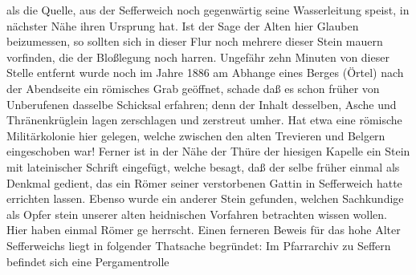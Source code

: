 

als die Quelle, aus der Sefferweich noch gegenwärtig seine\ob
Wasserleitung speist, in nächster Nähe ihren Ursprung hat.\ob
Ist der Sage der Alten hier Glauben beizumessen, so\ob
sollten sich in dieser Flur noch mehrere dieser Stein\ohb
mauern vorfinden, die der Bloßlegung noch harren.\ob
Ungefähr zehn Minuten von dieser Stelle entfernt\ob
wurde noch im Jahre 1886 am Abhange eines Berges\ob
(Örtel) nach der Abendseite ein römisches Grab geöffnet,\ob
schade daß es schon früher von Unberufenen dasselbe\ob
Schicksal erfahren; denn der Inhalt desselben, Asche\ob
und Thränenkrüglein lagen zerschlagen und zerstreut\ob
umher. Hat etwa eine römische Militärkolonie\ob
hier gelegen, welche zwischen den alten Trevieren\ob
und Belgern eingeschoben war! Ferner ist in der\ob
\margmark{|\\|\\|\\|\\|\\|}%
Nähe der Thüre der hiesigen Kapelle ein Stein mit\ob
lateinischer Schrift eingefügt, welche besagt, daß der\ohb
selbe früher einmal als Denkmal gedient, das\ob
ein Römer seiner verstorbenen Gattin in Sefferweich\ob
hatte errichten lassen. Ebenso wurde ein anderer\ob
Stein gefunden, welchen Sachkundige als Opfer\ohb
stein unserer alten heidnischen Vorfahren betrachten\ob
wissen wollen. Hier haben einmal Römer ge\ohb
herrscht.\ob
Einen ferneren Beweis für das hohe Alter Sefferweichs\ob
liegt in folgender Thatsache begründet: Im Pfarrarchiv\ob
zu Seffern befindet sich eine Pergamentrolle
\pend
